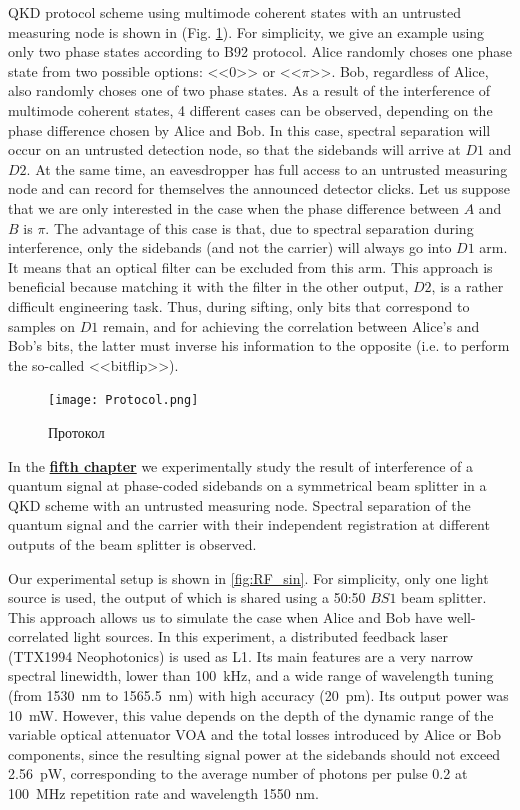 QKD protocol scheme using multimode coherent states with an untrusted measuring node is shown in (Fig. \ref{fig:Protocol}). For simplicity, we give an example using only two phase states according to  B92 protocol. Alice randomly choses one phase state from two possible options: <<$0$>> or <<$\pi$>>. Bob, regardless of Alice, also randomly choses one of two phase states. As a result of the interference of multimode coherent states, 4 different cases can be observed, depending on the phase difference chosen by Alice and Bob. In this case, spectral separation will occur on an untrusted detection node, so that the sidebands will arrive at $D1$ and $D2$. At the same time, an eavesdropper has full access to an untrusted measuring node and can record for themselves the announced detector clicks. Let us suppose that we are only interested in the case when the phase difference between $A$ and $B$ is $\pi$. The advantage of this case is that, due to spectral separation during interference, only the sidebands (and not the carrier) will always go into $D1$ arm. It means that an optical filter can be excluded from this arm. This approach is beneficial because matching it with the filter in the other output, $D2$, is a rather difficult engineering task. Thus, during sifting, only bits that correspond to samples on $D1$ remain, and for achieving the correlation between Alice's and Bob's bits, the latter must inverse his information to the opposite (i.e. to perform the so-called <<bitflip>>).

\begin{figure}[ht]
 \centering
  \texttt{[image: Protocol.png]}
  \caption{Протокол}
  \label{fig:Protocol}
\end{figure}
 
In the \underline{\textbf{fifth chapter}} we experimentally study the result of interference of a quantum signal at phase-coded sidebands on a symmetrical beam splitter in a QKD scheme with an untrusted measuring node. Spectral separation of the quantum signal and the carrier with their independent registration at different outputs of the beam splitter is observed. 
  
Our experimental setup is shown in \ref{fig:RF_sin}. For simplicity, only one light source is used, the output of which is shared using a 50:50 $BS1$ beam splitter. This approach allows us to simulate the case when Alice and Bob have well-correlated light sources. In this experiment, a distributed feedback laser (TTX1994 Neophotonics) is used as L1. Its main features are a very narrow spectral linewidth, lower than 100~kHz, and a wide range of wavelength tuning (from 1530~nm to 1565.5~nm) with high accuracy (20~pm). Its output power was 10~mW. However, this value depends on the depth of the dynamic range of the variable optical attenuator VOA and the total losses introduced by Alice or Bob components, since the resulting signal power at the sidebands should not exceed 2.56~pW, corresponding to the average number of photons per pulse 0.2 at 100~MHz repetition rate and wavelength 1550 nm.


